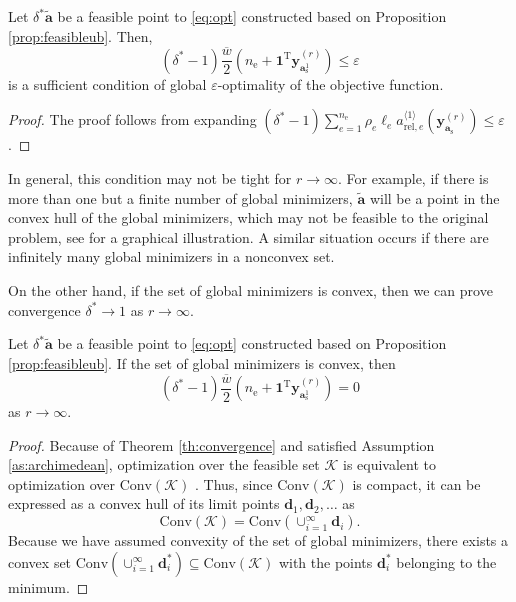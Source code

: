 \documentclass[final,onefignum,onetabnum]{siamart220329}
\newtheorem*{proof}{Proof}%
\begin{document}
\begin{proposition}
	Let $\delta^* \tilde{\mathbf{a}}$ be a feasible {point} to \eqref{eq:opt} constructed based on Proposition \ref{prop:feasibleub}. Then,
	\begin{equation}
		(\delta^* - 1)\frac{\overline{w}}{2} \left(n_\mathrm{e} + \mathbf{1}^\mathrm{T} \mathbf{y}^{(r)}_{\mathbf{a}_{\mathrm{s}}^1}
        \right) \le \varepsilon
	\end{equation}
	is a sufficient condition of global $\varepsilon$-optimality of the objective function.
\end{proposition}
\begin{proof}
	The proof follows from expanding $(\delta^*-1) \sum_{e=1}^{n_\mathrm{e}}\rho_e\ell_e a_{\mathrm{rel},e}^{\langle 1\rangle}
(\mathbf{y}^{(r)}_{\mathbf{a}_{\mathrm{s}}})
 \le 
 \varepsilon$.
\end{proof}

In general, this condition may not be tight for $r\rightarrow \infty$. For example, if there is more than one but a finite number of global minimizers, $\tilde{\mathbf{a}}$ will be a point in the convex hull of the global minimizers, which may not be feasible to the original problem, see \cite[Section 4.2]{Tyburec2021} for a graphical illustration. A similar situation occurs if there are infinitely many global minimizers in a nonconvex set.

On the other hand, if the set of global minimizers is convex, then we can prove convergence $\delta^* \rightarrow 1$ as $r \rightarrow \infty$.

\begin{theorem}\label{th:convergence_up}
	Let $\delta^* \tilde{\mathbf{a}}$ be a feasible {point} to \eqref{eq:opt} constructed based on Proposition \ref{prop:feasibleub}. If the set of global minimizers is convex, then
	\begin{equation}
		(\delta^* - 1)\frac{\overline{w}}{2} \left(n_\mathrm{e} + \mathbf{1}^\mathrm{T} \mathbf{y}^{(r)}_{\mathbf{a}_{\mathrm{s}}^1}\right) = 0
	\end{equation}
	as $r\rightarrow\infty$.
\end{theorem}
\begin{proof}
	Because of Theorem \ref{th:convergence} and satisfied Assumption \ref{as:archimedean}, optimization over the feasible set $\mathcal{K}$ is equivalent to optimization over $\mathrm{Conv}\left(\mathcal{K}\right)$ \cite[Proposition 7]{Tyburec2021}. Thus, since $\mathrm{Conv}\left(\mathcal{K}\right)$ is compact, it can be expressed as a convex hull of its limit points $\mathbf{d}_1, \mathbf{d}_2,\dots$ as
	\begin{equation}
		\mathrm{Conv}\left(\mathcal{K}\right) = \mathrm{Conv}\left(\cup_{i=1}^{\infty}\mathbf{d}_i\right).
	\end{equation}
	Because we have assumed convexity of the set of global minimizers, there exists a convex set $\mathrm{Conv}\left(\cup_{i=1}^{\infty} \mathbf{d}_i^*\right) \subseteq \mathrm{Conv}\left(\mathcal{K}\right)$ with the points $\mathbf{d}_i^*$ belonging to the minimum.
\end{proof}
\end{document}
